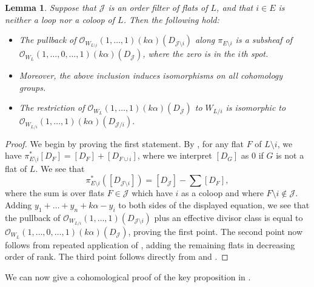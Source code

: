 \documentclass{amsart}
\newtheorem{lemma}[theorem]{Lemma}
\theoremstyle{definition}
\begin{document}
\begin{lemma}\label{lem:hierarchical-pullback-and-restriction}
    Suppose that $\mathcal{J}$ is an order filter of flats of $L$, 
    and that $i \in E$ is neither a loop nor a coloop of $L$. Then the following hold:
\begin{itemize}
\item The pullback of $\mathcal{O}_{W_{L\setminus i}}(1, \ldots, 1)(k\alpha)(D_{\mathcal{J}\setminus i})$ along $\pi_{E\setminus i}$ is a subsheaf of $\mathcal{O}_{W_L}(1, \ldots, 0, \ldots, 1)(k\alpha)(D_\mathcal{J})$, where the zero is in the $i$th spot. 
    \item Moreover, the above inclusion induces isomorphisms on all 
        cohomology groups.
    \item The restriction of $\mathcal{O}_{W_L}(1, \ldots, 
        1)(k\alpha)(D_{\mathcal{J}})$ to $W_{L/i}$ is isomorphic to 
        $\mathcal{O}_{W_{L/i}}(1, \ldots, 
        1)(k\alpha)(D_{\mathcal{J}/i}).$
    \end{itemize}
\end{lemma}
\begin{proof}
    We begin by proving the first statement. 
    By \cite[Section 3]{BHMPW20a}, for any flat $F$ of $L \setminus i$, we have $\pi_{E \setminus i}^* [D_F] = [D_F] + [D_{F \cup i}]$, where we interpret $[D_G]$ as $0$ if $G$ is not a flat of $L$. We see that 
    \[
        \pi_{E\setminus i}^*([D_{\mathcal{J}\setminus i}]) = [D_{\mathcal{J}}] - 
        \sum [D_F],
    \]
    where the sum is over flats $F \in \mathcal{J}$ which have $i$ as a 
    coloop and where $F\setminus i \not\in \mathcal{J}$. Adding 
    $y_1 + \ldots + y_n + k\alpha - y_i$ to both sides of the displayed 
    equation, we see that the pullback of $\mathcal{O}_{W_{L/i}}(1, 
    \ldots, 1)(D_{\mathcal{J}\setminus i})$ plus an effective divisor 
    class is equal to $\mathcal{O}_{W_L}(1, \ldots, 
    0,\ldots,1)(k\alpha)(D_{\mathcal{J}})$, proving the first point. The 
    second point now follows from repeated application of 
    , adding the remaining flats in decreasing order of rank. The third point follows directly from 
     and .
\end{proof}

We can now give a cohomological proof of the key proposition in 
\cite{LenzHierarchical}. 
\end{document}
